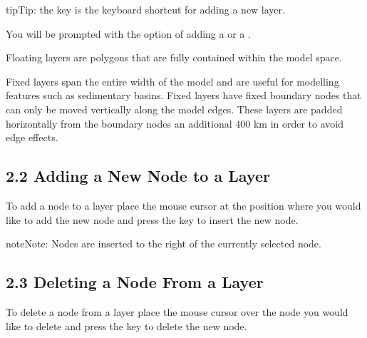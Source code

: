 \documentclass[a4paper,12pt,english]{sphinxmanual}
\begin{document}
\begin{sphinxadmonition}{tip}{Tip:}
the  key is the keyboard shortcut for adding a new layer.
\end{sphinxadmonition}

You will be prompted with the option of adding a  or a .


Floating layers are polygons that are fully contained within the model space.


Fixed layers span the entire width of the model and are useful for modelling features such as sedimentary basins.
Fixed layers have fixed boundary nodes that can only be moved vertically along the model edges.
These layers are padded horizontally from the boundary nodes an additional 400 km in order to avoid edge effects.

\begin{DUlineblock}{0em}
\item[] 
\end{DUlineblock}


\subsection{2.2 Adding a New Node to a Layer}
\label{\detokenize{manual__layer_nodes:adding-a-new-node-to-a-layer}}
To add a node to a layer place the mouse cursor at the position where you would like to add the new node and
press the  key to insert the new node.

\begin{sphinxadmonition}{note}{Note:}
Nodes are inserted to the right of the currently selected node.
\end{sphinxadmonition}

\begin{DUlineblock}{0em}
\item[] 
\end{DUlineblock}


\subsection{2.3 Deleting a Node From a Layer}
\label{\detokenize{manual__layer_nodes:deleting-a-node-from-a-layer}}
To delete a node from a layer place the mouse cursor over the node you would like to delete and
press the  key to delete the new node.
\end{document}
